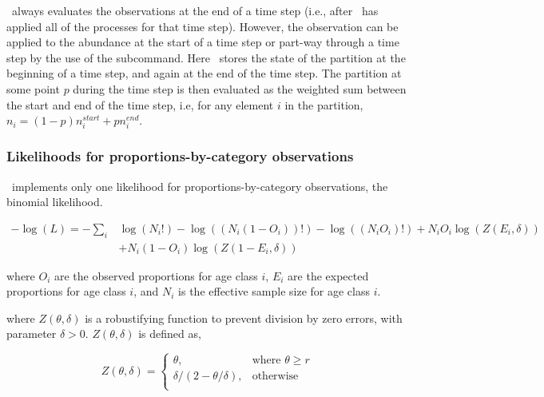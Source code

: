 \SPM\ always evaluates the observations at the end of a time step (i.e., after \SPM\ has applied all of the processes for that time step). However, the observation can be applied to the abundance at the start of a time step or part-way through a time step by the use of the  subcommand. Here \SPM\ stores the state of the partition at the beginning of a time step, and again at the end of the time step. The partition at some point $p$ during the time step is then evaluated as the weighted sum between the start and end of the time step, i.e, for any element $i$ in the partition, $n_i=(1-p) n_i^{start} + p n_i^{end}$.

\subsubsection{Likelihoods for proportions-by-category observations}

\SPM\ implements only one likelihood for proportions-by-category observations, the binomial likelihood. 

\begin{equation}
  \begin{split}
    -\log \left(L \right)= -\sum\limits_i & \log \left(N_i! \right) - \log \left(\left(N_i \left(1 - O_i \right) \right)! \right) - \log \left(\left(N_i O_i \right)! \right) + N_i O_i \log \left(Z\left(E_i,\delta \right) \right) \\
    &+ N_i \left(1 - O_i \right)\log \left(Z\left(1 - E_i,\delta\right) \right)
  \end{split}
\end{equation}

where $O_i$ are the observed proportions for age class $i$, $E_i$ are the expected proportions for age class $i$, and $N_i$ is the effective sample size for age class $i$. 

where $Z \left(\theta,\delta \right)$ is a robustifying function to prevent division by zero errors, with parameter $\delta>0$. $Z \left(\theta,\delta \right)$ is defined as,

\begin{equation}
   Z \left(\theta,\delta \right) = \begin{cases}
	  \theta, & \text{where $\theta \ge r$} \\
	  \delta/\left( 2-\theta/\delta \right), & \text{otherwise} \\  
  \end{cases}
\end{equation}

